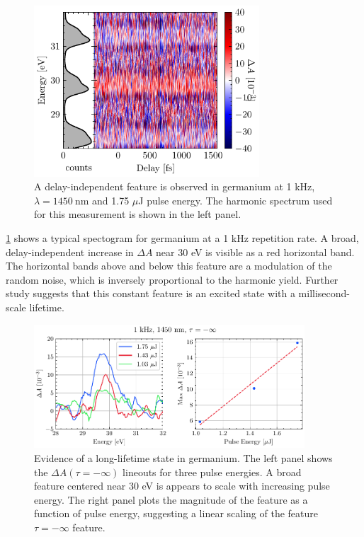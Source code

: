 \begin{figure}
	\centering
	\includegraphics[width=0.75\textwidth]{figures/chap4/ODvsDelay_1kHz_1p75uJ_dark.pdf}
	\caption{A delay-independent feature is observed in germanium at 1 kHz, $\lambda = 1450 \ \textrm{nm}$ and 1.75 $\mu$J pulse energy. The harmonic spectrum used for this measurement is shown in the left panel.}
	\label{fig:ODvsDelay_1kHz_1p75uJ_dark}
\end{figure}

\cref{fig:ODvsDelay_1kHz_1p75uJ_dark} shows a typical spectogram for germanium at a 1 kHz repetition rate. A broad, delay-independent increase in $\Delta A$ near 30 eV is visible as a red horizontal band. The horizontal bands above and below this feature are a modulation of the random noise, which is inversely proportional to the harmonic yield. Further study suggests that this constant feature is an excited state with a millisecond-scale lifetime.

\begin{figure}
	\centering
	\includegraphics[width=0.90\textwidth]{figures/chap4/neg_inf_PulseEnergy_scaling_1kHz.pdf}
	\caption{Evidence of a long-lifetime state in germanium. The left panel shows the $\Delta A(\tau=-\infty)$ lineouts for three pulse energies. A broad feature centered near 30 eV is appears to scale with increasing pulse energy. The right panel plots the magnitude of the feature as a function of pulse energy, suggesting a linear scaling of the feature $\tau=-\infty$ feature.}
	\label{fig:neg_inf_PulseEnergy_scaling_1kHz}
\end{figure}

